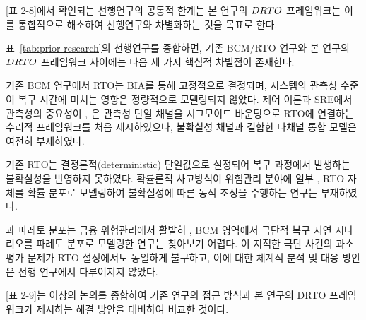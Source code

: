[표 2-8]에서 확인되는 선행연구의 공통적 한계는  본 연구의 $DRTO$ 프레임워크는 이
를 통합적으로 해소하여 선행연구와 차별화하는 것을 목표로 한다.



\p{[}표~\ref{tab:prior-research}\p{]}의 선행연구를 종합하면, 기존 BCM/RTO 연구와
본 연구의 $DRTO$ 프레임워크 사이에는 다음 세 가지 핵심적 차별점이 존재한다.

 기존 BCM 연구에서 RTO는 BIA를 통해 고정적으로 결정되며, 시스템의 관측성 수준이 복구 시간에 미치는 영향은 정량적으로 모델링되지 않았다. 제어 이론\citep{kalman1960control}과 SRE\citep{beyer2016sre, majors2022observability}에서 관측성의 중요성이 , \citet{lee2026drto}은 관측성 단일 채널을 시그모이드 바운딩으로 RTO에 연결하는 수리적 프레임워크를 처음 제시하였으나, 불확실성 채널과 결합한 다채널 통합 모델은 여전히 부재하였다.

 기존 RTO는 결정론적(deterministic) 단일값으로 설정되어 복구 과정에서 발생하는 불확실성을 반영하지 못하였다. 확률론적 사고방식\citep{gelman2013bayesian, jaynes2003probability}이 위험관리 분야에 일부 , RTO 자체를 확률 분포로 모델링하여 불확실성에 따른 동적 조정을 수행하는 연구는 부재하였다.

 과 파레토 분포는 금융 위험관리\citep{embrechts1997extremal, mcneil2015risk}에서 활발히 , BCM 영역에서 극단적 복구 지연 시나리오를 파레토 분포로 모델링한 연구는 찾아보기 어렵다. \citet{taleb2007blackswan}이 지적한 극단 사건의 과소평가 문제가 RTO 설정에서도 동일하게  불구하고, 이에 대한 체계적 분석 및 대응 방안은 선행 연구에서 다루어지지 않았다.

[표 2-9]는 이상의 논의를 종합하여 기존 연구의 접근 방식과 본 연구의 DRTO 프레임워크가 제시하는 해결 방안을 대비하여 비교한 것이다.

